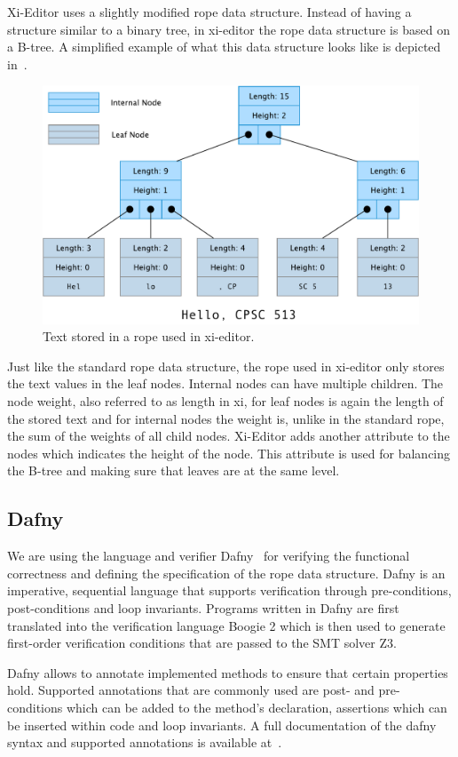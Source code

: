 Xi-Editor uses a slightly modified rope data structure.
Instead of having a structure similar to a binary tree, in xi-editor the rope data structure is based on a B-tree.
A simplified example of what this data structure looks like is depicted in~.

\begin{figure}[h]
\centering
\includegraphics[width=\linewidth]{"figures/xi-rope"}
\caption{Text stored in a rope used in xi-editor.}
\label{fig:xi-rope}
\end{figure}

Just like the standard rope data structure, the rope used in xi-editor only stores the text values in the leaf nodes.
Internal nodes can have multiple children.
The node weight, also referred to as length in xi, for leaf nodes is again the length of the stored text and for internal nodes the weight is, unlike in the standard rope, the sum of the weights of all child nodes.
Xi-Editor adds another attribute to the nodes which indicates the height of the node.
This attribute is used for balancing the B-tree and making sure that leaves are at the same level.

\subsection{Dafny}

We are using the language and verifier Dafny~\cite{leino2010dafny} for verifying the functional correctness and defining the specification of the rope data structure.
Dafny is an imperative, sequential language that supports verification through pre-conditions, post-conditions and loop invariants.
Programs written in Dafny are first translated into the verification language Boogie 2 which is then used to generate first-order verification conditions that are passed to the SMT solver Z3.

Dafny allows to annotate implemented methods to ensure that certain properties hold.
Supported annotations that are commonly used are post- and pre-conditions which can be added to the method's declaration, assertions which can be inserted within code and loop invariants.
A full documentation of the dafny syntax and supported annotations is available at~\cite{dafnyManual}.

